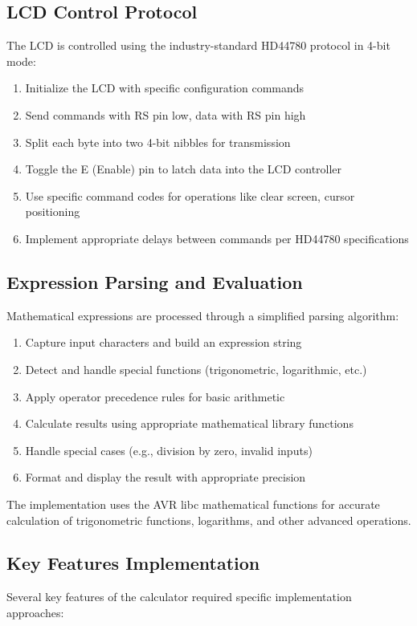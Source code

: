 \documentclass[12pt]{article}
\begin{document}
	\subsection{LCD Control Protocol}
	The LCD is controlled using the industry-standard HD44780 protocol in 4-bit mode:
	
	\begin{enumerate}
		\item Initialize the LCD with specific configuration commands
		\item Send commands with RS pin low, data with RS pin high
		\item Split each byte into two 4-bit nibbles for transmission
		\item Toggle the E (Enable) pin to latch data into the LCD controller
		\item Use specific command codes for operations like clear screen, cursor positioning
		\item Implement appropriate delays between commands per HD44780 specifications
	\end{enumerate}
	
	\subsection{Expression Parsing and Evaluation}
	Mathematical expressions are processed through a simplified parsing algorithm:
	
	\begin{enumerate}
		\item Capture input characters and build an expression string
		\item Detect and handle special functions (trigonometric, logarithmic, etc.)
		\item Apply operator precedence rules for basic arithmetic
		\item Calculate results using appropriate mathematical library functions
		\item Handle special cases (e.g., division by zero, invalid inputs)
		\item Format and display the result with appropriate precision
	\end{enumerate}
	
	The implementation uses the AVR libc mathematical functions for accurate calculation of trigonometric functions, logarithms, and other advanced operations.
	
	\subsection{Key Features Implementation}
	Several key features of the calculator required specific implementation approaches:
	
\end{document}
